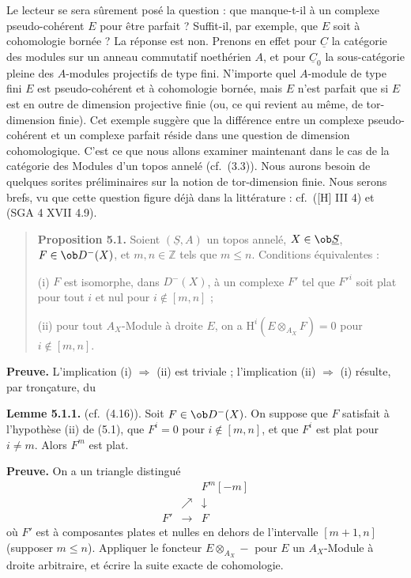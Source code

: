 Le lecteur se sera sûrement posé la question : que manque-t-il à un complexe pseudo-cohérent $E$ pour être parfait ? Suffit-il, par exemple, que $E$ soit à cohomologie bornée ? La réponse est non. Prenons en effet pour $\underline{C}$ la catégorie des modules sur un anneau commutatif noethérien $A$, et pour $\underline{C}_0$ la sous-catégorie pleine des $A$-modules projectifs de type fini. N'importe quel $A$-module de type fini $E$ est pseudo-cohérent et à cohomologie bornée, mais $E$ n'est parfait que si $E$ est en outre de dimension projective finie (ou, ce qui revient au même, de tor-dimension finie). Cet exemple suggère que la différence entre un complexe pseudo-cohérent et un complexe parfait réside dans une question de dimension cohomologique. C'est ce que nous allons examiner maintenant dans le cas de la catégorie des Modules d'un topos annelé (cf.\ (3.3)). Nous aurons besoin de quelques sorites préliminaires sur la notion de tor-dimension finie. Nous serons brefs, vu que cette question figure déjà dans la littérature : cf.\ ([H] III 4) et (SGA 4 XVII 4.9).

\begin{quote}
\textbf{Proposition 5.1.} Soient $(\underline{S}, A)$ un topos annelé, $X \in \ob \underline{S}$, $F \in \ob D^-(X)$, et $m, n \in \mathbb{Z}$ tels que $m \leqslant n$. Conditions équivalentes :

(i) $F$ est isomorphe, dans $D^-(X)$, à un complexe $F'$ tel que $F'^i$ soit plat pour tout $i$ et nul pour $i \notin [m, n]$ ;

(ii) pour tout $A_X$-Module à droite $E$, on a $\mathrm{H}^i(E \otimes_{A_X} F) = 0$ pour $i \notin [m, n]$.
\end{quote}

\textbf{Preuve.} L'implication (i) $\Rightarrow$ (ii) est triviale ; l'implication (ii) $\Rightarrow$ (i) résulte, par tronçature, du

\textbf{Lemme 5.1.1.} (cf.\ (4.16)). Soit $F \in \ob D^-(X)$. On suppose que $F$ satisfait à l'hypothèse (ii) de (5.1), que $F^i = 0$ pour $i \notin [m, n]$, et que $F^i$ est plat pour $i \neq m$. Alors $F^m$ est plat.

\textbf{Preuve.} On a un triangle distingué
\[
\begin{array}{ccc}
& & F^m[-m] \\
& \nearrow & \downarrow \\
F' & \longrightarrow & F
\end{array}
\]
où $F'$ est à composantes plates et nulles en dehors de l'intervalle $[m+1, n]$ (supposer $m \leqslant n$). Appliquer le foncteur $E \otimes_{A_X} -$ pour $E$ un $A_X$-Module à droite arbitraire, et écrire la suite exacte de cohomologie.

